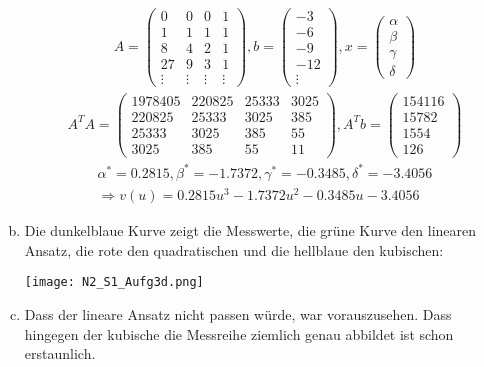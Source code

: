 \documentclass[11pt]{article} %
\begin{document}
\begin{enumerate}[a)]
\begin{eqnarray*}
A = \begin{pmatrix} 0& 0 & 0 & 1 \\ 1 & 1 & 1 & 1 \\ 8 & 4 & 2 & 1 \\ 27 & 9 & 3 & 1 \\ \vdots & \vdots & \vdots & \vdots \end{pmatrix},
b = \begin{pmatrix} -3 \\ -6 \\ -9 \\ -12 \\ \vdots \end{pmatrix}, x = \begin{pmatrix}\alpha \\ \beta \\ \gamma \\ \delta \end{pmatrix}
\end{eqnarray*}
\begin{eqnarray*}
A^TA = \begin{pmatrix}  1978405  &    220825   &    25333      &  3025 \\
      220825  &     25333 &       3025   &      385\\
       25333  &      3025  &       385     &     55\\
        3025   &      385    &      55   &       11
\end{pmatrix}, A^Tb = \begin{pmatrix} 154116 \\ 15782 \\ 1554 \\ 126 \end{pmatrix}
\end{eqnarray*}
\begin{eqnarray*}
\alpha^* =  0.2815, \beta^* =   -1.7372, \gamma^* =  -0.3485, \delta^* = -3.4056  \\ \Rightarrow v(u) = 0.2815u^3  -1.7372u^2 -  0.3485u -3.4056
\end{eqnarray*}

\item Die dunkelblaue Kurve zeigt die Messwerte, die grüne Kurve den linearen Ansatz, die rote den quadratischen und die hellblaue den kubischen:

\texttt{[image: N2\_S1\_Aufg3d.png]}

\item Dass der lineare Ansatz nicht passen würde, war vorauszusehen. Dass hingegen der kubische die Messreihe ziemlich genau abbildet ist schon erstaunlich.

\end{enumerate}
\end{document}
